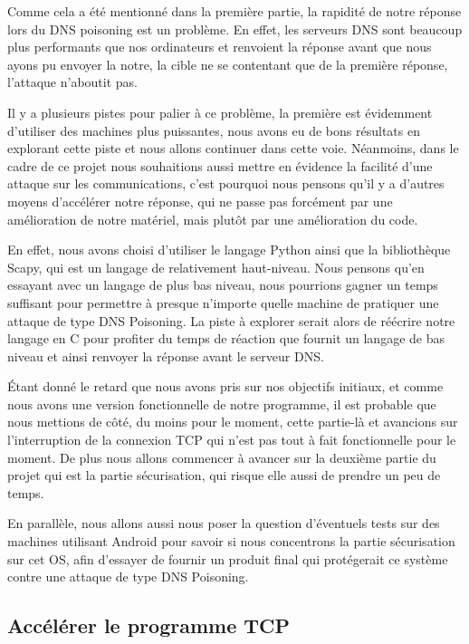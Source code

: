 \documentclass[a4paper, 12pt,twoside]{article}
\begin{document}
	Comme cela a été mentionné dans la première partie, la rapidité de notre réponse lors du DNS poisoning est un problème.
En effet, les serveurs DNS sont beaucoup plus performants que nos ordinateurs et renvoient la réponse avant que nous ayons pu envoyer la notre, la cible ne se contentant que de la première réponse, l'attaque n'aboutit pas.

	Il y a plusieurs pistes pour palier à ce problème, la première est évidemment d'utiliser des machines plus puissantes, nous avons eu de bons résultats en explorant cette piste et nous allons continuer dans cette voie. Néanmoins, dans le cadre de ce projet nous souhaitions aussi mettre en évidence la facilité d'une attaque sur les communications, c'est pourquoi nous pensons qu'il y a d'autres moyens d'accélérer notre réponse, qui ne passe pas forcément par une amélioration de notre matériel, mais plutôt par une amélioration du code.

	En effet, nous avons choisi d'utiliser le langage Python ainsi que la bibliothèque Scapy, qui est un langage de relativement haut-niveau. Nous pensons qu'en essayant avec un langage de plus bas niveau, nous pourrions gagner un temps suffisant pour permettre à presque n'importe quelle machine de pratiquer une attaque de type DNS Poisoning. La piste à explorer serait alors de réécrire notre langage en C pour profiter du temps de réaction que fournit un langage de bas niveau et ainsi renvoyer la réponse avant le serveur DNS.

	Étant donné le retard que nous avons pris sur nos objectifs initiaux, et comme nous avons une version fonctionnelle de notre programme, il est probable que nous mettions de côté, du moins pour le moment, cette partie-là et avancions sur l'interruption de la connexion TCP qui n'est pas tout à fait fonctionnelle pour le moment.
	De plus nous allons commencer à avancer sur la deuxième partie du projet qui est la partie sécurisation, qui risque elle aussi de prendre un peu de temps.

	En parallèle, nous allons aussi nous poser la question d'éventuels tests sur des machines utilisant Android pour savoir si nous concentrons la partie sécurisation sur cet OS, afin d'essayer de fournir un produit final qui protégerait ce système contre une attaque de type DNS Poisoning.

	 \subsection{Accélérer le programme TCP}
 
\end{document}
